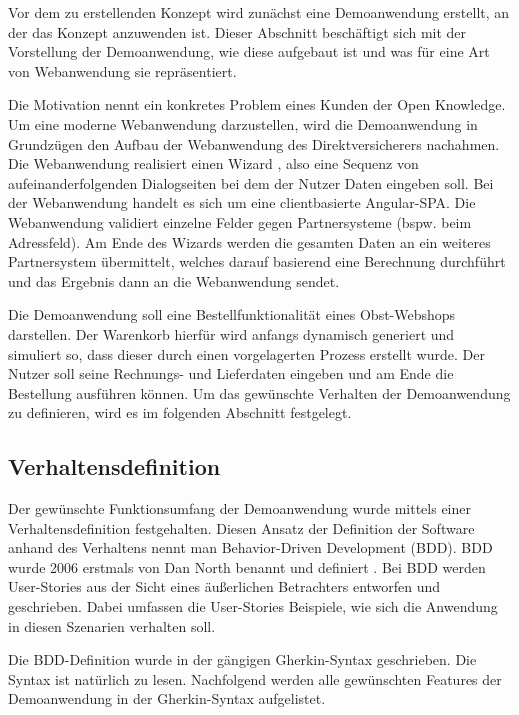 
Vor dem zu erstellenden Konzept wird zunächst eine Demoanwendung erstellt, an der das Konzept anzuwenden ist. Dieser Abschnitt beschäftigt sich mit der Vorstellung der Demoanwendung, wie diese aufgebaut ist und was für eine Art von Webanwendung sie repräsentiert.

Die Motivation nennt ein konkretes Problem eines Kunden der Open Knowledge. Um eine moderne Webanwendung \cite{RichWebBasedApplications} darzustellen, wird die Demoanwendung in Grundzügen den Aufbau der Webanwendung des Direktversicherers nachahmen. Die Webanwendung realisiert einen Wizard \cite{EzMolAWebServerWizard}, also eine Sequenz von aufeinanderfolgenden Dialogseiten bei dem der Nutzer Daten eingeben soll. Bei der Webanwendung handelt es sich um eine clientbasierte Angular-SPA. Die Webanwendung validiert einzelne Felder gegen Partnersysteme (bspw. beim Adressfeld). Am Ende des Wizards werden die gesamten Daten an ein weiteres Partnersystem übermittelt, welches darauf basierend eine Berechnung durchführt und das Ergebnis dann an die Webanwendung sendet.

Die Demoanwendung soll eine Bestellfunktionalität eines Obst-Webshops darstellen. Der Warenkorb hierfür wird anfangs dynamisch generiert und simuliert so, dass dieser durch einen vorgelagerten Prozess erstellt wurde. Der Nutzer soll seine Rechnungs- und Lieferdaten eingeben und am Ende die Bestellung ausführen können. Um das gewünschte Verhalten der Demoanwendung zu definieren, wird es im folgenden Abschnitt festgelegt.

\subsection{Verhaltensdefinition}

Der gewünschte Funktionsumfang der Demoanwendung wurde mittels einer Verhaltensdefinition festgehalten. Diesen Ansatz der Definition der Software anhand des Verhaltens nennt man Behavior-Driven Development (BDD). BDD wurde 2006 erstmals von Dan North benannt und definiert \cite{IntroducingBDD}. Bei BDD werden User-Stories aus der Sicht eines äußerlichen Betrachters entworfen und geschrieben. Dabei umfassen die User-Stories Beispiele, wie sich die Anwendung in diesen Szenarien verhalten soll.

Die BDD-Definition wurde in der gängigen Gherkin-Syntax \cite{Gherkin} geschrieben. Die Syntax ist natürlich zu lesen. Nachfolgend werden alle gewünschten Features der Demoanwendung in der Gherkin-Syntax aufgelistet.

